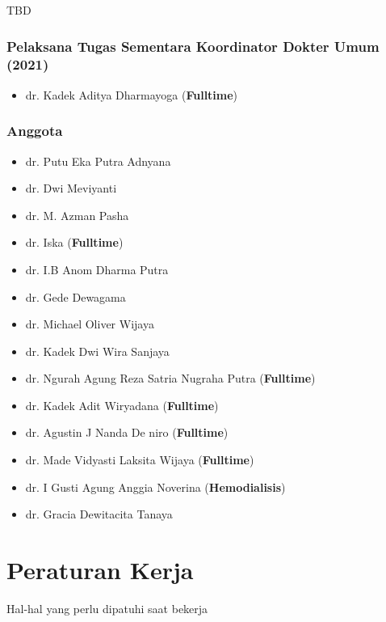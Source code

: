 \documentclass[
]{book}
\providecommand{\tightlist}{%
  \setlength{\itemsep}{0pt}\setlength{\parskip}{0pt}}
\begin{document}
TBD

\hypertarget{pelaksana-tugas-sementara-koordinator-dokter-umum-2021}{%
\subsection{Pelaksana Tugas Sementara Koordinator Dokter Umum (2021)}\label{pelaksana-tugas-sementara-koordinator-dokter-umum-2021}}

\begin{itemize}
\tightlist
\item
  dr. Kadek Aditya Dharmayoga (\textbf{Fulltime})
\end{itemize}

\hypertarget{anggota}{%
\subsection{Anggota}\label{anggota}}

\begin{itemize}
\tightlist
\item
  dr. Putu Eka Putra Adnyana
\item
  dr. Dwi Meviyanti
\item
  dr. M. Azman Pasha
\item
  dr. Iska (\textbf{Fulltime})
\item
  dr. I.B Anom Dharma Putra
\item
  dr. Gede Dewagama
\item
  dr. Michael Oliver Wijaya
\item
  dr. Kadek Dwi Wira Sanjaya
\item
  dr. Ngurah Agung Reza Satria Nugraha Putra (\textbf{Fulltime})
\item
  dr. Kadek Adit Wiryadana (\textbf{Fulltime})
\item
  dr. Agustin J Nanda De niro (\textbf{Fulltime})
\item
  dr. Made Vidyasti Laksita Wijaya (\textbf{Fulltime})
\item
  dr. I Gusti Agung Anggia Noverina (\textbf{Hemodialisis})
\item
  dr. Gracia Dewitacita Tanaya
\end{itemize}

\hypertarget{peraturan-kerja}{%
\chapter{Peraturan Kerja}\label{peraturan-kerja}}

Hal-hal yang perlu dipatuhi saat bekerja
\end{document}
